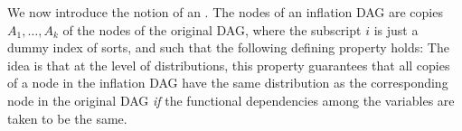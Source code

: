 








We now introduce the notion of an . The nodes of an inflation DAG are copies $A_1,\ldots,A_k$ of the nodes of the original DAG, where the subscript $i$ is just a dummy index of sorts, and such that the following defining property holds:  The idea is that at the level of distributions, this property guarantees that all copies of a node in the inflation DAG have the same distribution as the corresponding node in the original DAG \emph{if} the functional dependencies among the variables are taken to be the same.


